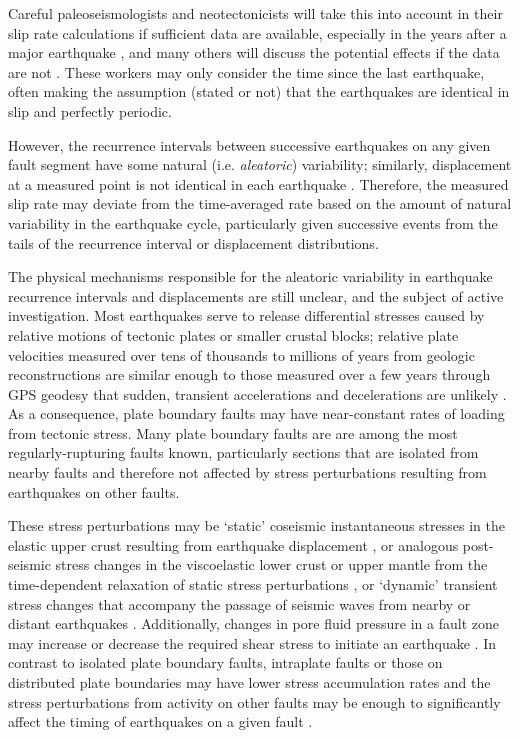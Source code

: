 \documentclass[se]{copernicus}
\begin{document}
Careful paleoseismologists and neotectonicists will take this into
account in their slip rate calculations if sufficient data are
available, especially in the years after a major earthquake
\citep[e.g.,][]{rizza_earthquake_2015}, and many others will discuss the
potential effects if the data are not \citep[e.g.,][]{lifton_latest_2015}.
These workers may only consider the time since the last earthquake,
often making the assumption (stated or not) that the earthquakes are
identical in slip and perfectly periodic.

However, the recurrence intervals between successive earthquakes on any
given fault segment have some natural (i.e. \emph{aleatoric})
variability; similarly, displacement at a measured point is not
identical in each earthquake \citep[e.g.,][]{duross_holocene_2008}.
Therefore, the measured slip rate may deviate from the time-averaged
rate based on the amount of natural variability in the earthquake cycle,
particularly given successive events from the tails of the recurrence
interval or displacement distributions.

The physical mechanisms responsible for the aleatoric variability in earthquake 
recurrence intervals and displacements are still unclear, and the subject of 
active investigation. Most earthquakes serve to release differential stresses 
caused by relative motions of tectonic plates or smaller crustal blocks; 
relative plate velocities measured over tens of thousands to millions of years 
from geologic reconstructions are similar enough to those measured over a few 
years through GPS geodesy that sudden, transient accelerations and 
decelerations are unlikely \citep[e.g.,][]{demets_new_1999}. As a consequence, 
plate boundary faults may have near-constant rates of loading from tectonic 
stress. Many plate boundary faults are are among the most regularly-rupturing 
faults known, particularly sections that are isolated from nearby faults 
\citep[e.g.,][]{berryman_major_2012} and therefore not affected by stress 
perturbations resulting from earthquakes on other faults. 

These stress perturbations may be `static' coseismic instantaneous stresses in 
the elastic upper crust resulting from earthquake displacement 
\citep{king_static_1994}, or analogous post-seismic stress changes in the 
viscoelastic lower crust or upper mantle from the time-dependent relaxation of 
static stress perturbations \citep[e.g.,][]{chery_postseismic_2001}, or 
`dynamic' transient stress changes that accompany the passage of seismic waves 
from nearby or distant earthquakes \citep{gomberg_dynamic_2005}.  Additionally, 
changes in pore fluid pressure in a fault zone may increase or decrease the 
required shear stress to initiate an earthquake 
\citep{steacy_introduction_2005}. In contrast to isolated plate boundary 
faults, intraplate faults or those on distributed plate boundaries may have 
lower stress accumulation rates and the stress perturbations from activity on 
other faults may be enough to significantly affect the timing of earthquakes on 
a given fault \citep{gomberg_time-dependent_2005}. 
\end{document}
